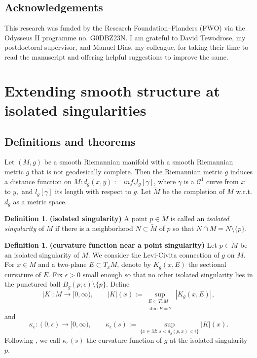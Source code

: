 \documentclass{amsart}
\let\oldcitet\citet
\renewcommand{\citet}[1]{\textcolor{blue}{\oldcitet{#1}}}
\theoremstyle{definition}
\newtheorem{definition}[theorem]{Definition}
\theoremstyle{remark}
\newcommand{\nd}{\noindent}
\newcommand{\0}{\boldsymbol{0}}
\begin{document}
\subsection{Acknowledgements} This research was funded by the Research Foundation–Flanders (FWO) via the Odysseus II programme no. G0DBZ23N. I am grateful to David Tewodrose, my postdoctoral supervisor, and Manuel Dias, my colleague, for taking their time to read the manuscript and offering helpful suggestions to improve the same.


\section{Extending smooth structure at isolated singularities}\label{scn:extension of smooth structure}


\subsection{Definitions and theorems}

\nd Let $(M,g)$ be a smooth Riemannian manifold with a smooth Riemannian metric $g$ that is not geodesically complete. Then the Riemannian metric $g$ induces a distance function on $M:d_g(x,y):=inf_{\gamma} l_g[\gamma]$, where $\gamma$ is a $\mathcal{C}^1$ curve from $x$ to $y,$ and $l_g[\gamma]$ its length with respect to $g.$ Let $\widetilde{M}$ be the completion of $M$ w.r.t. $d_g$ as a metric space. 

\begin{definition}\label{isolated/point singularity}\textbf{(isolated singularity)}
    \nd A point $p\in \widetilde{M}$ is called an \textit{isolated singularity} of $M$ if there is a neighborhood $N\subset \widetilde{M}$ of $p$ so that $N\cap M=N\setminus \{p\}.$
\end{definition}


\begin{definition}\label{def:curvature function}\textbf{(curvature function near a point singularity)}
Let $p\in \widetilde M$ be an isolated singularity of $M$. We consider the Levi-Civita connection of $g$ on $M$. For $x\in M$ and a two-plane $E\subset T_xM$, denote by $K_g(x,E)$ the sectional curvature of $E$. Fix $\epsilon>0$ small enough so that no other isolated singularity lies in the punctured ball \(B_g(p;\epsilon)\setminus\{p\}\). Define
\[
|K|:M\to[0,\infty),\qquad
|K|(x):=\sup_{\substack{E\subset T_xM\\ \dim E=2}} |K_g(x,E)|,
\]
and
\[
\kappa_\epsilon:(0,\epsilon)\to[0,\infty),\qquad
\kappa_\epsilon(s):=
\sup_{\{x\in M:\, s<d_g(p,x)<\epsilon\}} |K|(x).
\]
Following \citet{SmithYang1992}, we call $\kappa_\epsilon(s)$ the curvature function of $g$ at the isolated singularity $p$.
\end{definition}
\end{document}
